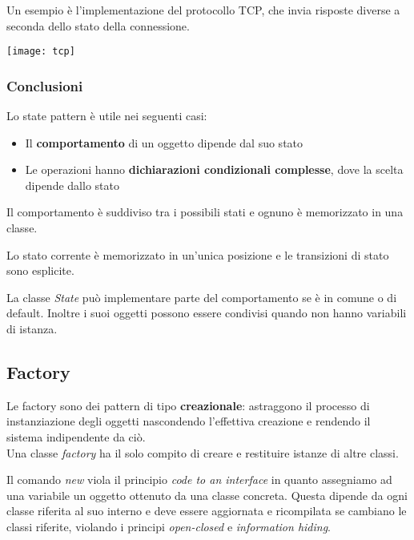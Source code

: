 \begin{example}[TCP]
	Un esempio è l'implementazione del protocollo TCP, che invia risposte diverse a seconda dello stato della connessione.
	\begin{center}
		\texttt{[image: tcp]}
	\end{center}
\end{example}

\subsubsection{Conclusioni}
Lo state pattern è utile nei seguenti casi:
\begin{itemize}
	\item Il \textbf{comportamento} di un oggetto dipende dal suo stato
	\item Le operazioni hanno \textbf{dichiarazioni condizionali complesse}, dove la scelta dipende dallo stato
\end{itemize}

\begin{observation}
	Il comportamento è suddiviso tra i possibili stati e ognuno è memorizzato in una classe.
\end{observation}
\begin{observation}
	Lo stato corrente è memorizzato in un'unica posizione e le transizioni di stato sono esplicite.
\end{observation}
\begin{observation}
	La classe \textit{State} può implementare parte del comportamento se è in comune o di default. Inoltre i suoi oggetti possono essere condivisi quando non hanno variabili di istanza.
\end{observation}

\subsection{Factory}
Le factory sono dei pattern di tipo \textbf{creazionale}: astraggono il processo di instanziazione degli oggetti nascondendo l'effettiva creazione e rendendo il sistema indipendente da ciò.\\
Una classe \textit{factory} ha il solo compito di creare e restituire istanze di altre classi.

\begin{observation}[New]
	Il comando \textit{new} viola il principio \textit{code to an interface} in quanto assegniamo ad una variabile un oggetto ottenuto da una classe concreta. Questa dipende da ogni classe riferita al suo interno e deve essere aggiornata e ricompilata se cambiano le classi riferite, violando i principi \textit{open-closed} e \textit{information hiding}.
\end{observation}

